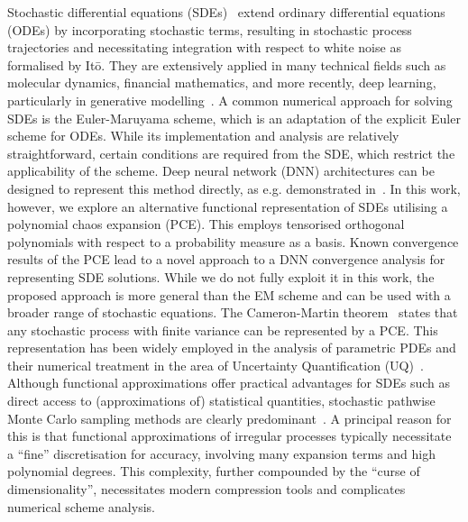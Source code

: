 \documentclass[12pt]{article}
\theoremstyle{remark}
\theoremstyle{plain}
\numberwithin{equation}{section}
\begin{document}
Stochastic differential equations (SDEs)~\cite{ksendal2003} extend ordinary differential equations (ODEs) by incorporating stochastic terms, resulting in stochastic process trajectories and necessitating integration with respect to white noise as formalised by It\=o. They are extensively applied in many technical fields such as molecular dynamics, financial mathematics, and more recently, deep learning, particularly in generative modelling~\cite{yang2023diffusion}.
A common numerical approach for solving SDEs is the Euler-Maruyama scheme, which is an adaptation of the explicit Euler scheme for ODEs. While its implementation and analysis are relatively straightforward, certain conditions are required from the SDE, which restrict the applicability of the scheme. Deep neural network (DNN) architectures can be designed to represent this method directly, as e.g. demonstrated in~\cite{E2017,miranda2024approximatinglangevinmontecarlo}.
In this work, however, we explore an alternative functional representation of SDEs utilising a polynomial chaos expansion (PCE). This employs tensorised orthogonal polynomials with respect to a probability measure as a basis.
Known convergence results of the PCE lead to a novel approach to a DNN convergence analysis for representing SDE solutions.
While we do not fully exploit it in this work, the proposed approach is more general than the EM scheme and can be used with a broader range of stochastic equations.
The Cameron-Martin theorem~\cite{cameron1947orthogonal,janson1997gaussian} states that any stochastic process with finite variance can be represented by a PCE. This representation has been widely employed in the analysis of parametric PDEs and their numerical treatment in the area of Uncertainty Quantification (UQ)~\cite{schwab2011sparse,cohen2015approximation,ernst2012convergence}.
Although functional approximations offer practical advantages for SDEs such as direct access to (approximations of) statistical quantities, stochastic pathwise Monte Carlo sampling methods are clearly predominant~\cite{holden1996stochastic}.
A principal reason for this is that functional approximations of irregular processes typically necessitate a ``fine'' discretisation for accuracy, involving many expansion terms and high polynomial degrees. This complexity, further compounded by the ``curse of dimensionality'', necessitates modern compression tools and complicates numerical scheme analysis.
\end{document}
